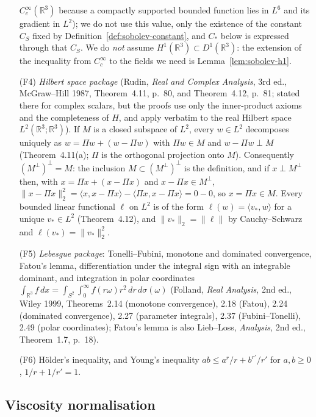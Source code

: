 \documentclass[11pt]{article}
\theoremstyle{definition}
\theoremstyle{plain}
\newcommand{\R}{\mathbb R}
\newcommand{\norm}[1]{\lVert #1\rVert}
\begin{document}
\begin{itemize}
 $C_c^\infty(\R^3)$ because a compactly supported bounded function lies in
 $L^6$ and its gradient in $L^2$); we do not use this value, only the
 existence of the constant $C_S$ fixed by
 Definition~\ref{def:sobolev-constant}, and $C_*$ below is expressed
 through that $C_S$.  We do \emph{not} assume $H^1(\R^3)\subset D^1(\R^3)$: the
 extension of the inequality from $C_c^\infty$ to the fields we need is
 Lemma~\ref{lem:sobolev-h1}.
\item[(F4)] \emph{Hilbert space package} (Rudin, \emph{Real and Complex
 Analysis}, 3rd ed., McGraw--Hill 1987, Theorem~4.11, p.~80, and
 Theorem~4.12, p.~81; stated there for complex scalars, but the proofs use
 only the inner-product axioms and the completeness of $H$, and apply verbatim
 to the real Hilbert space $L^2(\R^3;\R^3)$).  If $M$ is a closed subspace of
 $L^2$, every $w\in L^2$ decomposes uniquely as $w=\Pi w+(w-\Pi w)$ with
 $\Pi w\in M$ and $w-\Pi w\perp M$ (Theorem~4.11(a); $\Pi$ is the orthogonal
 projection onto $M$).  Consequently $(M^\perp)^\perp=M$: the inclusion
 $M\subset(M^\perp)^\perp$ is the definition, and if $x\perp M^\perp$ then,
 with $x=\Pi x+(x-\Pi x)$ and $x-\Pi x\in M^\perp$,
 $\norm{x-\Pi x}_2^2=\langle x,x-\Pi x\rangle-\langle\Pi x,x-\Pi x\rangle=0-0$,
 so $x=\Pi x\in M$.  Every bounded linear functional $\ell$ on $L^2$ is of the
 form $\ell(w)=\langle v_*,w\rangle$ for a unique $v_*\in L^2$
 (Theorem~4.12), and $\norm{v_*}_2=\norm\ell$ by Cauchy--Schwarz and
 $\ell(v_*)=\norm{v_*}_2^2$.
\item[(F5)] \emph{Lebesgue package}: Tonelli--Fubini, monotone and dominated
 convergence, Fatou's lemma, differentiation under the integral sign with an
 integrable dominant, and integration in polar coordinates
 $\int_{\R^3}f\,dx=\int_{S^2}\int_0^\infty f(r\omega)r^2\,dr\,d\sigma(\omega)$
 (Folland, \emph{Real Analysis}, 2nd ed., Wiley 1999, Theorems~2.14 (monotone
 convergence), 2.18 (Fatou), 2.24 (dominated convergence), 2.27 (parameter
 integrals), 2.37 (Fubini--Tonelli), 2.49 (polar coordinates); Fatou's lemma
 is also Lieb--Loss, \emph{Analysis}, 2nd ed., Theorem~1.7, p.~18).
\item[(F6)] H\"older's inequality, and Young's inequality
 $ab\leq a^{r}/r+b^{r'}/r'$ for $a,b\geq0$, $1/r+1/r'=1$.
\end{itemize}

\subsection{Viscosity normalisation}
\end{document}
